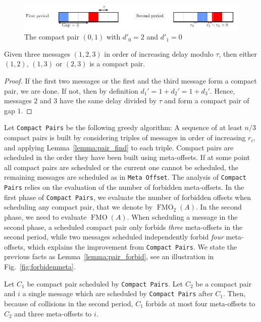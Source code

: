 \documentclass[a4paper,UKenglish,cleveref, autoref, thm-restate]{lipics-v2019}
\DeclareMathOperator{\Fmo}{FMO}
\newcommand\compactpair{\texttt{Compact Pairs}\xspace}
\newcommand\metaoffset{\texttt{Meta Offset}\xspace}
\begin{document}
\begin{figure}[h]
\begin{center}

\includegraphics[scale=0.7]{compact_pair}
\end{center}
\caption{The compact pair $(0,1)$ with $d'_0 = 2$ and $d'_1 = 0$}
\label{fig:compactpair}
\end{figure}

\begin{lemma}\label{lemma:pair_find}
Given three messages $(1,2,3)$ in order of increasing delay modulo $\tau$, then either $(1,2)$, $(1,3)$ or $(2,3)$ is a compact pair. 
\end{lemma}
\begin{proof}
If the first two messages or the first and the third message form a compact pair, we are done. If not, then by definition $d_{1}' = 1 + d_{2}' = 1 + d_{3}'$. Hence, messages $2$ and $3$ have the same delay divided by $\tau$ and form a compact pair of gap $1$.
\end{proof}

Let \compactpair be the following greedy algorithm:  A sequence of at least $n/3$ compact pairs is built by considering triples of messages in order of increasing $r_i$, and applying Lemma~\ref{lemma:pair_find} to each triple. Compact pairs are scheduled in the order they have been built using meta-offsets. If at some point all compact pairs are scheduled or the current one cannot be scheduled, the remaining messages are scheduled as in \metaoffset. The analysis of \compactpair relies on the evaluation of the number of forbidden meta-offsets. In the first phase of \compactpair, we evaluate the number of forbidden offsets when scheduling any compact pair, that we denote by $\Fmo_2(A)$. In the second phase, we need to evaluate $\Fmo(A)$. When scheduling a message in the second phase, a scheduled compact pair only forbids \emph{three} meta-offsets in the second period, while two messages scheduled independently forbid \emph{four} meta-offsets, which explains the improvement from \compactpair. We state the previous facts as Lemma~\ref{lemma:pair_forbid}, see an illustration in Fig.~\ref{fig:forbidenmeta}. 

\begin{lemma}\label{lemma:pair_forbid}
Let $C_1$ be compact pair scheduled by \compactpair. Let $C_2$  be a compact pair and $i$ a single message which are scheduled by \compactpair after $C_1$.
Then, because of collisions in the second period, $C_1$ forbids at most four meta-offsets to $C_2$ and three meta-offsets to $i$. 
\end{lemma}
\end{document}
